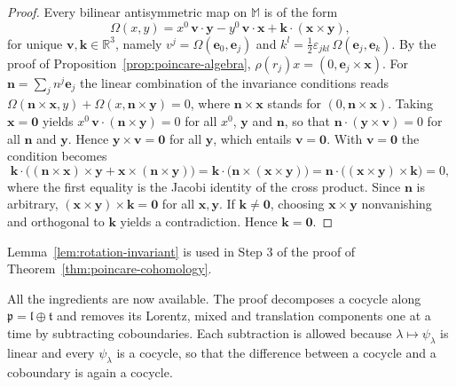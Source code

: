 \begin{proof}
	Every bilinear antisymmetric map on $\mathbb{M}$ is of the form
	\begin{equation*}
		\Omega(x,y)=x^0\,\mathbf{v}\cdot\mathbf{y}-y^0\,\mathbf{v}\cdot\mathbf{x}+\mathbf{k}\cdot(\mathbf{x}\times\mathbf{y}),
	\end{equation*}
	for unique $\mathbf{v},\mathbf{k}\in\mathbb{R}^3$, namely $v^j=\Omega(\mathbf{e}_0,\mathbf{e}_j)$ and $k^l=\tfrac12\varepsilon_{jkl}\,\Omega(\mathbf{e}_j,\mathbf{e}_k)$. By the proof of Proposition~\ref{prop:poincare-algebra}, $\rho(r_j)x=(0,\mathbf{e}_j\times\mathbf{x})$. For $\mathbf{n}=\sum_jn^j\mathbf{e}_j$ the linear combination of the invariance conditions reads $\Omega(\mathbf{n}\times\mathbf{x},y)+\Omega(x,\mathbf{n}\times\mathbf{y})=0$, where $\mathbf{n}\times\mathbf{x}$ stands for $(0,\mathbf{n}\times\mathbf{x})$. Taking $\mathbf{x}=\mathbf{0}$ yields $x^0\,\mathbf{v}\cdot(\mathbf{n}\times\mathbf{y})=0$ for all $x^0$, $\mathbf{y}$ and $\mathbf{n}$, so that $\mathbf{n}\cdot(\mathbf{y}\times\mathbf{v})=0$ for all $\mathbf{n}$ and $\mathbf{y}$. Hence $\mathbf{y}\times\mathbf{v}=\mathbf{0}$ for all $\mathbf{y}$, which entails $\mathbf{v}=\mathbf{0}$. With $\mathbf{v}=\mathbf{0}$ the condition becomes
	\begin{equation*}
		\mathbf{k}\cdot\big((\mathbf{n}\times\mathbf{x})\times\mathbf{y}+\mathbf{x}\times(\mathbf{n}\times\mathbf{y})\big)=\mathbf{k}\cdot\big(\mathbf{n}\times(\mathbf{x}\times\mathbf{y})\big)=\mathbf{n}\cdot\big((\mathbf{x}\times\mathbf{y})\times\mathbf{k}\big)=0,
	\end{equation*}
	where the first equality is the Jacobi identity of the cross product. Since $\mathbf{n}$ is arbitrary, $(\mathbf{x}\times\mathbf{y})\times\mathbf{k}=\mathbf{0}$ for all $\mathbf{x},\mathbf{y}$. If $\mathbf{k}\neq\mathbf{0}$, choosing $\mathbf{x}\times\mathbf{y}$ nonvanishing and orthogonal to $\mathbf{k}$ yields a contradiction. Hence $\mathbf{k}=\mathbf{0}$.
\end{proof}

\noindent Lemma~\ref{lem:rotation-invariant} is used in Step 3 of the proof of Theorem~\ref{thm:poincare-cohomology}.

All the ingredients are now available. The proof decomposes a cocycle along $\mathfrak{p}=\mathfrak{l}\oplus\mathfrak{t}$ and removes its Lorentz, mixed and translation components one at a time by subtracting coboundaries. Each subtraction is allowed because $\lambda\mapsto\psi_\lambda$ is linear and every $\psi_\lambda$ is a cocycle, so that the difference between a cocycle and a coboundary is again a cocycle.

